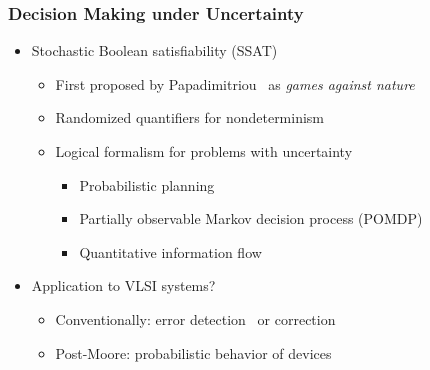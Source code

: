 \begin{frame}
      \frametitle{Decision Making under Uncertainty}
      \begin{itemize}
            \item Stochastic Boolean satisfiability (SSAT)
                  \pause
                  \begin{itemize}
                        \item First proposed by Papadimitriou~\cite{Papadimitriou1985} as \emph{games against nature}
                              \pause
                        \item Randomized quantifiers for nondeterminism
                              \pause
                        \item Logical formalism for problems with uncertainty
                              \pause
                              \begin{itemize}
                                    \item Probabilistic planning~\cite{Majercik1998,
                                                Majercik2003,
                                                Majercik2005}
                                          \pause
                                    \item Partially observable Markov decision process (POMDP)~\cite{Salmon2020}
                                          \pause
                                    \item Quantitative information flow~\cite{Fremont2017}
                                          \pause
                              \end{itemize}
                  \end{itemize}
            \item Application to VLSI systems?
                  \pause
                  \begin{itemize}
                        \item Conventionally: error detection~\cite{Constantinescu2003} or correction~\cite{Mitra2006}
                              \pause
                        \item Post-Moore: probabilistic behavior of devices~\cite{Chakrapani2006ProbDesign}
                  \end{itemize}
      \end{itemize}
\end{frame}


